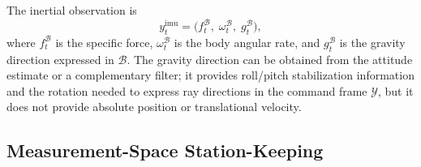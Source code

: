 \documentclass[11pt]{article}
\begin{document}
The inertial observation is
\begin{equation}
    y^{\mathrm{imu}}_t = \bigl(f^{\mathcal{B}}_t,\; \omega^{\mathcal{B}}_t,
    \; g^{\mathcal{B}}_t\bigr),
    \label{eq:imu_obs}
\end{equation}
where $f^{\mathcal{B}}_t$ is the specific force, $\omega^{\mathcal{B}}_t$ is the
body angular rate, and $g^{\mathcal{B}}_t$ is the gravity direction expressed in
$\mathcal{B}$. The gravity direction can be obtained from the attitude estimate
or a complementary filter; it provides roll/pitch stabilization information and
the rotation needed to express ray directions in the command frame
$\mathcal{Y}$, but it does not provide absolute position or translational
velocity.

\subsection{Measurement-Space Station-Keeping}
\label{sec:method_anchor}
\end{document}
